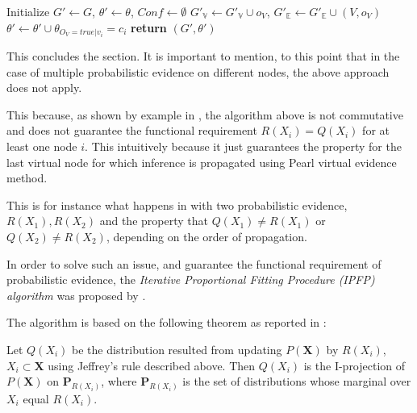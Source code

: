 \documentclass[11pt]{article}
\begin{document}
\begin{article}
\begin{algorithm*}[h!]
\begin{multicols}{2}
\begin{algorithmic}[1]
  \State Initialize $G'\leftarrow G$, $\theta'\leftarrow\theta$, $Conf \leftarrow \emptyset$
    
  \EndFor
    \State $G'_{\mathbb{V}}\leftarrow G'_{\mathbb{V}}\cup o_{V}$, $G'_{\mathbb{E}}\leftarrow G'_{\mathbb{E}}\cup(V,o_{V})$      
       
      \State $\theta'\leftarrow\theta'\cup\theta_{O_{V}=true|v_{i}}=c_{i}$ 
    \EndFor
  \EndFor
\State \textbf{return} $(G',\theta')$
\end{algorithmic}
\end{multicols}
\end{algorithm*}

This concludes the section. It is important to mention, to this
point that in the case of multiple probabilistic evidence on
different nodes, the above approach does not apply.

This because, as shown by example in \cite{PENG_2010}, the algorithm
above is not commutative and does not guarantee the functional
requirement \(R(X_i) = Q(X_i)\) for at least one node \(i\). This
intuitively because it just guarantees the property for the last
virtual node for which inference is propagated using Pearl virtual
evidence method.

This is for instance what happens in \cite{PENG_2010} with two
probabilistic evidence, \(R(X_1), R(X_2)\) and the property that
\(Q(X_1) \neq R(X_1)\) or \(Q(X_2) \neq R(X_2)\), depending on the
order of propagation.

In order to solve such an issue, and guarantee the functional
requirement of probabilistic evidence, the \emph{Iterative Proportional
Fitting Procedure (IPFP) algorithm} was proposed by
\cite{Valtorta_2002}.

The algorithm is based on the following theorem as reported in
\cite{PENG_2010}:

\begin{theorem}\label{thm:two-I-projection}
Let $Q(X_i)$ be the distribution resulted from updating $P(\textbf{X})$ by $R(X_i)$,
$X_i \subset \textbf{X}$ using Jeffrey’s rule described above. Then $Q(X_i)$ is the I-projection of $P(\textbf{X})$ on
$\textbf{P}_{R(X_i)}$, where $\textbf{P}_{R(X_i)}$ is the set of distributions whose marginal over $X_i$ equal $R(X_i)$.
\end{theorem}


\end{article}
\end{document}
